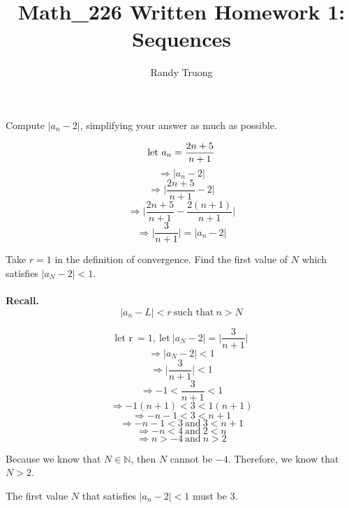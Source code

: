 \documentclass{article}
\title{Math\_226 Written Homework 1: Sequences}
\author{Randy Truong}
\newenvironment{problem}[2][Problem]{\begin{trivlist}
\item[\hskip \labelsep {\bfseries #1}\hskip \labelsep {\bfseries #2.}]}{\end{trivlist}}
\newcommand{\N}{\mathbb{N}}
\begin{document}
\maketitle
\begin{problem}{1.1}
  Compute $ | a_{n} - 2 | $, simplifying your answer as much
  as possible.
\end{problem}
\[ \textrm{let $ a_{n} $} = \frac{2n+5}{n+1}\]
\[ \Rightarrow |a_{n} - 2 |\]
\[ \Rightarrow \Biggr|\frac{2n+5}{n+1} - 2 \Biggr|\]
\[ \Rightarrow \Biggr|\frac{2n+5}{n+1} - \frac{2(n+1)}{n+1}\Biggr| \]
\[ \Rightarrow \Biggr|\frac{3}{n+1}\Biggr| = |a_{n} - 2|\]

\begin{problem}{1.2}
  Take $ r = 1 $ in the definition of convergence. Find
  the first value of $ N $ which satisfies $ |a_{N} - 2 | < 1 $.
  \\
  \\
  \textbf{Recall.}
  \[ |a_{n} - L| < r ~\textrm{such that}~ n>N \]

  \[ \textrm{let r}~ = 1, ~ \textrm{let} ~|a_{N} - 2| = \Biggr|\frac{3}{n+1}\Biggr|\]
  \[ \Rightarrow |a_{N} - 2| < 1\]
  \[ \Rightarrow \Biggr| \frac{3}{n+1} \Biggr| < 1 \]
  \[ \Rightarrow -1 < \frac{3}{n+1} < 1 \]
  \[ \Rightarrow -1(n+1) < 3 < 1(n+1) \]
  \[ \Rightarrow -n - 1 < 3 < n + 1 \]
  \[ \Rightarrow -n -1 < 3 ~\textrm{and} ~ 3 < n+1 \]
  \[ \Rightarrow -n < 4 ~\textrm{and} ~ 2 < n \]
  \[ \Rightarrow n > -4 ~ \textrm{and} ~ n > 2 \]

  Because we know that $ N \in \N $, then $ N $ cannot be $ -4 $.
  Therefore, we know that $ N > 2 $. \\

  \begin{center}
    The first value $ N $ that satisfies $ |a_{n} - 2| < 1 $ must
    be 3.
  \end{center}

  \[ \]

\end{problem}
\end{document}
